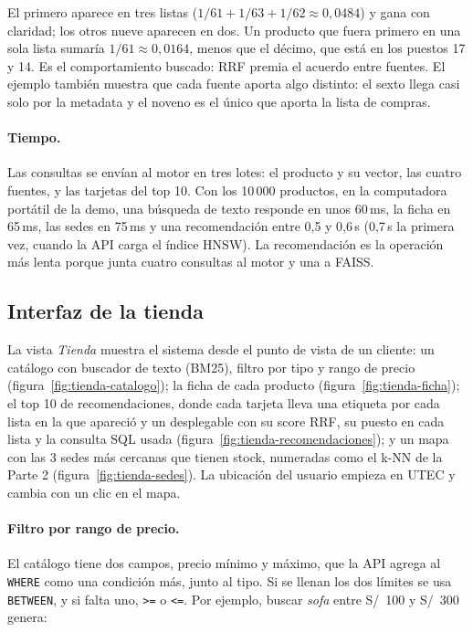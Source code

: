 \documentclass[11pt,a4paper]{article}
\begin{document}
El primero aparece en tres listas ($1/61 + 1/63 + 1/62 \approx 0{,}0484$) y gana con claridad; los otros nueve aparecen en dos. Un producto que fuera primero en una sola lista sumaría $1/61 \approx 0{,}0164$, menos que el décimo, que está en los puestos 17 y 14. Es el comportamiento buscado: RRF premia el acuerdo entre fuentes. El ejemplo también muestra que cada fuente aporta algo distinto: el sexto llega casi solo por la metadata y el noveno es el único que aporta la lista de compras.

\paragraph{Tiempo.} Las consultas se envían al motor en tres lotes: el producto y su vector, las cuatro fuentes, y las tarjetas del top 10. Con los 10\,000 productos, en la computadora portátil de la demo, una búsqueda de texto responde en unos 60\,ms, la ficha en 65\,ms, las sedes en 75\,ms y una recomendación entre 0,5 y 0,6\,s (0,7\,s la primera vez, cuando la API carga el índice HNSW). La recomendación es la operación más lenta porque junta cuatro consultas al motor y una a FAISS.

\subsection{Interfaz de la tienda}
\label{sec:interfaz-tienda}

La vista \emph{Tienda} muestra el sistema desde el punto de vista de un cliente: un catálogo con buscador de texto (BM25), filtro por tipo y rango de precio (figura~\ref{fig:tienda-catalogo}); la ficha de cada producto (figura~\ref{fig:tienda-ficha}); el top 10 de recomendaciones, donde cada tarjeta lleva una etiqueta por cada lista en la que apareció y un desplegable con su score RRF, su puesto en cada lista y la consulta SQL usada (figura~\ref{fig:tienda-recomendaciones}); y un mapa con las 3 sedes más cercanas que tienen stock, numeradas como el k-NN de la Parte 2 (figura~\ref{fig:tienda-sedes}). La ubicación del usuario empieza en UTEC y cambia con un clic en el mapa.

\paragraph{Filtro por rango de precio.} El catálogo tiene dos campos, precio mínimo y máximo, que la API agrega al \texttt{WHERE} como una condición más, junto al tipo. Si se llenan los dos límites se usa \texttt{BETWEEN}, y si falta uno, \texttt{>=} o \texttt{<=}. Por ejemplo, buscar \emph{sofa} entre S/~100 y S/~300 genera:
\end{document}

